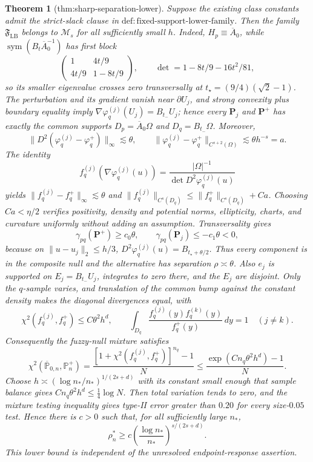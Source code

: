 \documentclass{article}
\newtheorem{theorem}{Theorem}
\begin{document}
\begin{theorem}[thm:sharp-separation-lower]\label{thm:sharp-separation-lower}
Suppose the existing class constants admit the strict-slack clause in \(\mathrm{def:fixed\text{-}support\text{-}lower\text{-}family}\). Then the family \(\mathfrak F_{\mathrm{LB}}\) belongs to \(\mathcal M_s\) for all sufficiently small \(h\). Indeed, \(H_p\equiv\overline A_0\), while \(\operatorname{sym}(B_t\overline A_0^{-1})\) has first block
\[
 \begin{pmatrix}1&4t/9\\4t/9&1-8t/9\end{pmatrix},
 \qquad \det=1-8t/9-16t^2/81,
\]
so its smaller eigenvalue crosses zero transversally at \(t_\star=(9/4)(\sqrt2-1)\). The perturbation and its gradient vanish near \(\partial U_j\), and strong convexity plus boundary equality imply \(\nabla\varphi_q^{(j)}(U_j)=B_{t_{-}}U_j\); hence every \(\mathbf P_j\) and \(\mathbf P^+\) has exactly the common supports \(D_p=\overline A_0\Omega\) and \(D_q=B_{t_{-}}\Omega\). Moreover,
\[
 \lVert D^2(\varphi_q^{(j)}-\varphi_q^+)\rVert_\infty\lesssim\theta,
 \qquad
 \lVert\varphi_q^{(j)}-\varphi_q^+\rVert_{C^{s+2}(\Omega)}\lesssim\theta h^{-s}=a.
\]
The identity
\[
 f_q^{(j)}(\nabla\varphi_q^{(j)}(u))
 =\frac{\lvert\Omega\rvert^{-1}}{\det D^2\varphi_q^{(j)}(u)}
\]
yields \(\lVert f_q^{(j)}-f_q^+\rVert_\infty\lesssim\theta\) and \(\lVert f_q^{(j)}\rVert_{C^s(D_q)}\le\lVert f_q^+\rVert_{C^s(D_q)}+Ca\). Choosing \(Ca<\eta/2\) verifies positivity, density and potential norms, ellipticity, charts, and curvature uniformly without adding an assumption. Transversality gives
\[
 \gamma_{pq}(\mathbf P^+)\ge c_0\theta,
 \qquad
 \gamma_{pq}(\mathbf P_j)\le-c_1\theta<0,
\]
because on \(\lVert u-u_j\rVert_2\le h/3\), \(D^2\varphi_q^{(j)}(u)=B_{t_\star+\theta/2}\). Thus every component is in the composite null and the alternative has separation \(\rho\asymp\theta\). Also \(e_j\) is supported on \(E_j=B_{t_{-}}U_j\), integrates to zero there, and the \(E_j\) are disjoint. Only the \(q\)-sample varies, and translation of the common bump against the constant density makes the diagonal divergences equal, with
\[
 \chi^2(f_q^{(j)},f_q^+)\le C\theta^2h^d,
 \qquad
 \int_{D_q}\frac{f_q^{(j)}(y)f_q^{(k)}(y)}{f_q^+(y)}\,dy=1
 \quad(j\ne k).
\]
Consequently the fuzzy-null mixture satisfies
\[
 \chi^2(\overline{\mathbb P}_{0,n},\mathbb P_n^+)
 =\frac{[1+\chi^2(f_q^{(j)},f_q^+)]^{n_q}-1}{N}
 \le\frac{\exp(Cn_q\theta^2h^d)-1}{N}.
\]
Choose \(h\asymp(\log n_\ast/n_\ast)^{1/(2s+d)}\) with its constant small enough that sample balance gives \(Cn_q\theta^2h^d\le\tfrac14\log N\). Then total variation tends to zero, and the mixture testing inequality gives type-II error greater than \(0.20\) for every size-\(0.05\) test. Hence there is \(c>0\) such that, for all sufficiently large \(n_\ast\),
\[
 \rho_n^\ast\ge c\left(\frac{\log n_\ast}{n_\ast}\right)^{s/(2s+d)}.
\]
This lower bound is independent of the unresolved endpoint-response assertion.
\end{theorem}
\end{document}
